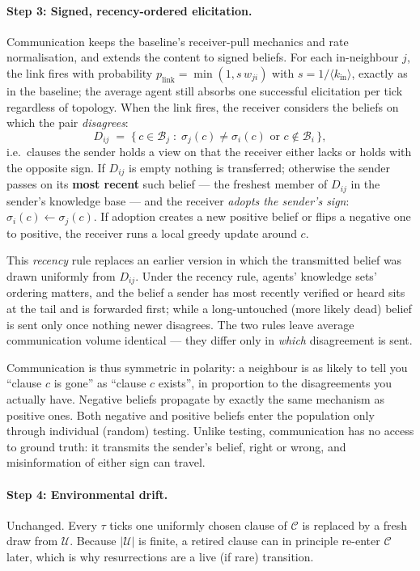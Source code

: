 \documentclass{article}
\begin{document}
\paragraph{Step 3: Signed, recency-ordered elicitation.} Communication keeps the baseline's receiver-pull mechanics and rate normalisation, and extends the content to signed beliefs. For each in-neighbour $j$, the link fires with probability $p_{\text{link}} = \min(1, s\,w_{ji})$ with $s = 1/\langle k_{\text{in}} \rangle$, exactly as in the baseline; the average agent still absorbs one successful elicitation per tick regardless of topology. When the link fires, the receiver considers the beliefs on which the pair \emph{disagrees}:
$$
D_{ij} \;=\; \{\, c \in \mathcal{B}_j \;:\; \sigma_j(c) \neq \sigma_i(c) \text{ or } c \notin \mathcal{B}_i \,\},
$$
i.e.\ clauses the sender holds a view on that the receiver either lacks or holds with the opposite sign. If $D_{ij}$ is empty nothing is transferred; otherwise the sender passes on its \textbf{most recent} such belief --- the freshest member of $D_{ij}$ in the sender's knowledge base  --- and the receiver \emph{adopts the sender's sign}: $\sigma_i(c) \leftarrow \sigma_j(c)$. If adoption creates a new positive belief or flips a negative one to positive, the receiver runs a local greedy update around $c$.

This \emph{recency} rule replaces an earlier version in which the transmitted belief was drawn uniformly from $D_{ij}$. Under the recency rule, agents' knowledge sets' ordering matters, and the belief a sender has most recently verified or heard sits at the tail and is forwarded first; while a long-untouched (more likely dead) belief is sent only once nothing newer disagrees. The two rules leave average communication volume identical --- they differ only in \emph{which} disagreement is sent.

Communication is thus symmetric in polarity: a neighbour is as likely to tell you ``clause $c$ is gone'' as ``clause $c$ exists'', in proportion to the disagreements you actually have. Negative beliefs propagate by exactly the same mechanism as positive ones. Both negative and positive beliefs enter the population only through individual (random) testing. Unlike testing, communication has no access to ground truth: it transmits the sender's belief, right or wrong, and misinformation of either sign can travel.

\paragraph{Step 4: Environmental drift.} Unchanged. Every $\tau$ ticks one uniformly chosen clause of $\mathcal{C}$ is replaced by a fresh draw from $\mathcal{U}$. Because $|\mathcal{U}|$ is finite, a retired clause can in principle re-enter $\mathcal{C}$ later, which is why resurrections are a live (if rare) transition.
\end{document}
